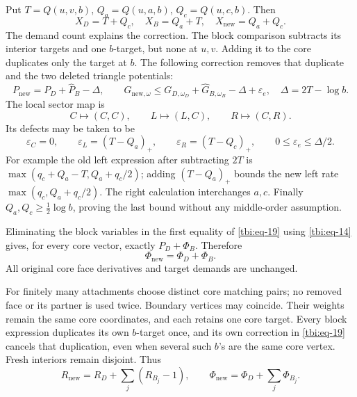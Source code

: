 Put \(T=Q(u,v,b)\), \(Q_a=Q(u,a,b)\), \(Q_c=Q(u,c,b)\). Then
\begin{equation}\label{tbi:eq-18}
X_D=T+Q_c,\quad X_B=Q_a+T,\quad X_{\mathrm{new}}=Q_a+Q_c.
\end{equation}
The demand count explains the correction. The block comparison subtracts
its interior targets and one \(b\)-target, but none at \(u,v\).
Adding it to the core duplicates only the target at \(b\).
The following correction removes that duplicate and the two deleted
triangle potentials:
\begin{equation}\label{tbi:eq-19}
P_{\mathrm{new}}=P_D+\widehat P_B-\Delta,\qquad
G_{\mathrm{new},\omega}\le
G_{D,\omega_D}+\widehat G_{B,\omega_B}-\Delta+\varepsilon_e,
\quad \Delta=2T-\log b.
\end{equation}
The local sector map is
\begin{equation}\label{tbi:eq-20}
C\mapsto(C,C),\qquad L\mapsto(L,C),\qquad R\mapsto(C,R).
\end{equation}
Its defects may be taken to be
\begin{equation}\label{tbi:eq-20a}
\varepsilon_C=0,\qquad
\varepsilon_L=(T-Q_a)_+,\qquad
\varepsilon_R=(T-Q_c)_+,\qquad
0\le\varepsilon_e\le\Delta/2.
\end{equation}
For example the old left expression after subtracting \(2T\) is
\(\max(q_c+Q_a-T,Q_a+q_c/2)\); adding \((T-Q_a)_+\) bounds the new left rate \(\max(q_c,Q_a+q_c/2)\). The right calculation interchanges \(a,c\). Finally \(Q_a,Q_c\ge\frac12\log b\), proving the last bound without any middle-order assumption.

Eliminating the block variables in the first equality of \eqref{tbi:eq-19} using \eqref{tbi:eq-14} gives, for every core vector, exactly \(P_D+\Phi_B\). Therefore
\begin{equation}\label{tbi:eq-21}
\Phi_{\mathrm{new}}=\Phi_D+\Phi_B.
\end{equation}
All original core face derivatives and target demands are unchanged.

For finitely many attachments choose distinct core matching pairs; no removed face or its partner is used twice. Boundary vertices may coincide. Their weights remain the same core coordinates, and each retains one core target. Every block expression duplicates its own \(b\)-target once, and its own correction in \eqref{tbi:eq-19} cancels that duplication, even when several such \(b\)'s are the same core vertex. Fresh interiors remain disjoint. Thus
\begin{equation}\label{tbi:eq-22}
R_{\mathrm{new}}=R_D+\sum_j(R_{B_j}-1),
\qquad
\Phi_{\mathrm{new}}=\Phi_D+\sum_j\Phi_{B_j}.
\end{equation}

